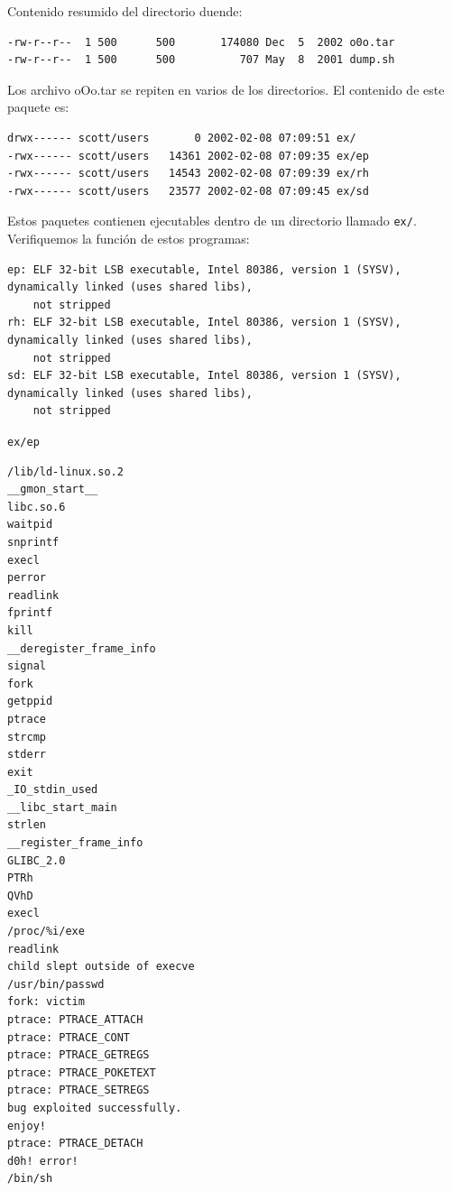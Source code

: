 \vspace{1em}

Contenido resumido del directorio duende:
 
\vspace{1em}

\begin{lstlisting}[style=terminal]
-rw-r--r--  1 500      500       174080 Dec  5  2002 o0o.tar
-rw-r--r--  1 500      500          707 May  8  2001 dump.sh
\end{lstlisting}

\vspace{1em}


 Los archivo oOo.tar se repiten en varios de los directorios. El contenido de este paquete es:
 
\vspace{1em}

\begin{lstlisting}[style=terminal]
drwx------ scott/users       0 2002-02-08 07:09:51 ex/
-rwx------ scott/users   14361 2002-02-08 07:09:35 ex/ep
-rwx------ scott/users   14543 2002-02-08 07:09:39 ex/rh
-rwx------ scott/users   23577 2002-02-08 07:09:45 ex/sd
\end{lstlisting}

\vspace{1em}

 Estos paquetes contienen ejecutables dentro de un directorio llamado
 \texttt{ex/}. Verifiquemos la función de estos programas:
 
\vspace{1em}

\begin{lstlisting}[style=terminal]
ep: ELF 32-bit LSB executable, Intel 80386, version 1 (SYSV), dynamically linked (uses shared libs), 
    not stripped
rh: ELF 32-bit LSB executable, Intel 80386, version 1 (SYSV), dynamically linked (uses shared libs), 
    not stripped
sd: ELF 32-bit LSB executable, Intel 80386, version 1 (SYSV), dynamically linked (uses shared libs), 
    not stripped
\end{lstlisting}

\vspace{1em}

\texttt{ex/ep}


\vspace{1em}

\begin{lstlisting}[style=terminal]
/lib/ld-linux.so.2
__gmon_start__
libc.so.6
waitpid
snprintf
execl
perror
readlink
fprintf
kill
__deregister_frame_info
signal
fork
getppid
ptrace
strcmp
stderr
exit
_IO_stdin_used
__libc_start_main
strlen
__register_frame_info
GLIBC_2.0
PTRh
QVhD
execl
/proc/%i/exe
readlink
child slept outside of execve
/usr/bin/passwd
fork: victim
ptrace: PTRACE_ATTACH
ptrace: PTRACE_CONT
ptrace: PTRACE_GETREGS
ptrace: PTRACE_POKETEXT
ptrace: PTRACE_SETREGS
bug exploited successfully.
enjoy!
ptrace: PTRACE_DETACH
d0h! error!
/bin/sh
\end{lstlisting}

